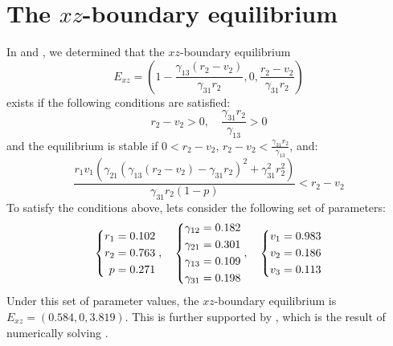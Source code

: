 \section{The $xz$-boundary equilibrium}\label{sec:numsim_xz_boundary_equilibrium}
In  and , we determined that the $xz$-boundary equilibrium
\[
E_{xz}=\left(1-\frac{\gamma_{13}\left(r_2-v_2\right)}{\gamma_{31}r_2},0,\frac{r_2-v_2}{\gamma_{31}r_2}\right)
\]
exists if the following conditions are satisfied:
\[
r_2-v_2>0,\quad \frac{\gamma_{31}r_2}{\gamma_{13}}>0
\]
and the equilibrium is stable if $0<r_2-v_2$, $\displaystyle r_2-v_2<\frac{\gamma_{31}r_2}{\gamma_{13}}$, and:
\[
\frac{r_1v_1\left(\gamma_{21}\left(\gamma_{13}\left(r_2-v_2\right)-\gamma_{31}r_2\right)^2+\gamma_{31}^2r_2^2\right)}{\gamma_{31}r_2\left(1-p\right)}<r_2-v_2
\]
To satisfy the conditions above, lets consider the following set of parameters:
\begin{equation}
    \begin{dcases}
        \begin{aligned}
            r_1 &= 0.102\\
            r_2 &= 0.763\\
            p &= 0.271
        \end{aligned}
    \end{dcases},\quad 
    \begin{dcases}
        \begin{aligned}
            \gamma_{12} &= 0.182\\
            \gamma_{21} &= 0.301\\
            \gamma_{13} &= 0.109\\
            \gamma_{31} &= 0.198
        \end{aligned}
    \end{dcases},\quad
    \begin{dcases}
        \begin{aligned}
            v_1 &= 0.983\\
            v_2 &= 0.186\\
            v_3 &= 0.113
        \end{aligned}
    \end{dcases} 
    \label{params:6.3}
\end{equation}
Under this set of parameter values, the $xz$-boundary equilibrium is $E_{xz}=(0.584,0,3.819)$. This is further supported by , which is the result of numerically solving .

